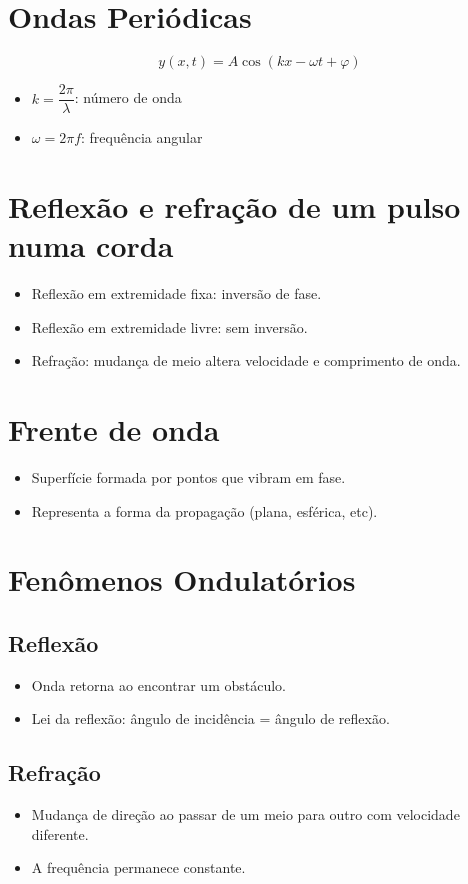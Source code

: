 \documentclass[a4paper,12pt]{article}
\begin{document}
\begin{multicols}{2}
\section{Ondas Periódicas}
\[
    y(x, t) = A \cos(kx - \omega t + \varphi)
\]
\begin{itemize}
    \item $k = \dfrac{2\pi}{\lambda}$: número de onda
    \item $\omega = 2\pi f$: frequência angular
\end{itemize}

\section{Reflexão e refração de um pulso numa corda}
\begin{itemize}
    \item Reflexão em extremidade fixa: inversão de fase.
    \item Reflexão em extremidade livre: sem inversão.
    \item Refração: mudança de meio altera velocidade e comprimento de onda.
\end{itemize}

\section{Frente de onda}
\begin{itemize}
    \item Superfície formada por pontos que vibram em fase.
    \item Representa a forma da propagação (plana, esférica, etc).
\end{itemize}

\section{Fenômenos Ondulatórios}
\subsection{Reflexão}
\begin{itemize}
    \item Onda retorna ao encontrar um obstáculo.
    \item Lei da reflexão: ângulo de incidência = ângulo de reflexão.
\end{itemize}

\subsection{Refração}
\begin{itemize}
    \item Mudança de direção ao passar de um meio para outro com velocidade diferente.
    \item A frequência permanece constante.
\end{itemize}


\end{multicols}
\end{document}
